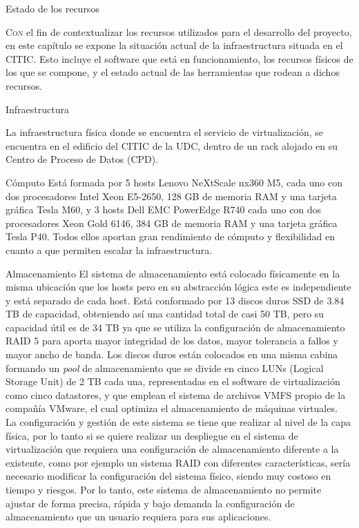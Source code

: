 \begin{chapter}{Estado de los recursos}
\label{chap:estado-recursos-CITIC-VCF}

\lettrine{C}{on} el fin de contextualizar los recursos utilizados para el desarrollo del proyecto, en este capítulo se expone la situación actual de la infraestructura situada en el CITIC. Esto incluye el software que está en funcionamiento, los recursos físicos de los que se compone, y el estado actual de las herramientas que rodean a dichos recursos.

\begin{section}{Infraestructura}

    La infraestructura física donde se encuentra el servicio de virtualización, se encuentra en el edificio del CITIC de la UDC, dentro de un rack alojado en su Centro de Proceso de Datos (CPD)\cite{citicUDC}.
\begin{subsection}{Cómputo}
    Está formada por 5 hosts Lenovo NeXtScale nx360 M5, cada uno con dos procesadores Intel Xeon E5-2650, 128 GB de memoria RAM y una tarjeta gráfica Tesla M60,  y 3 hosts Dell EMC PowerEdge R740 cada uno con dos procesadores Xeon Gold 6146, 384 GB de memoria RAM y una tarjeta gráfica Tesla P40. Todos ellos aportan gran rendimiento de cómputo y flexibilidad en cuanto a que permiten escalar la infraestructura.
\end{subsection}
\begin{subsection}{Almacenamiento}
    El sistema de almacenamiento está colocado físicamente en la misma ubicación que los hosts pero en su abstracción lógica este es independiente y está separado de cada host. Está conformado por 13 discos duros SSD de 3.84 TB de capacidad, obteniendo así una cantidad total de casi 50 TB, pero su capacidad útil es de 34 TB ya que se utiliza la configuración de almacenamiento RAID 5 para aporta mayor integridad de los datos, mayor tolerancia a fallos y mayor ancho de banda. Los discos duros están colocados en una misma cabina formando un \textit{pool} de almacenamiento que se divide en cinco LUNs (Logical Storage Unit) de 2 TB cada una, representadas en el software de virtualización como cinco datastores, y que emplean el sistema de archivos VMFS propio de la compañía VMware, el cual optimiza el almacenamiento de máquinas virtuales.\\
    La configuración y gestión de este sistema se tiene que realizar al nivel de la capa física, por lo tanto si se quiere realizar un despliegue en el sistema de virtualización que requiera una configuración de almacenamiento diferente a la existente, como por ejemplo un sistema RAID con diferentes características, sería necesario modificar la configuración del sistema físico, siendo muy costoso en tiempo y riesgos. Por lo tanto, este sistema de almacenamiento no permite ajustar de forma precisa, rápida y bajo demanda la configuración de almacenamiento que un usuario requiera para sus aplicaciones.
\end{subsection}


\end{section}
\end{chapter}
